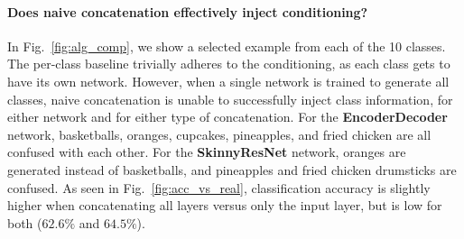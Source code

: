 \paragraph{Does naive concatenation effectively inject conditioning?} In Fig.~\ref{fig:alg_comp}, we show a selected example from each of the 10 classes. The per-class baseline trivially adheres to the conditioning, as each class gets to have its own network. However, when a single network is trained to generate all classes, naive concatenation is unable to successfully inject class information, for either network and for either type of concatenation. For the \textbf{EncoderDecoder} network, basketballs, oranges, cupcakes, pineapples, and fried chicken are all confused with each other. For the \textbf{SkinnyResNet} network, oranges are generated instead of basketballs, and pineapples and fried chicken drumsticks are confused. As seen in Fig.~\ref{fig:acc_vs_real}, classification accuracy is slightly higher when concatenating all layers versus only the input layer, but is low for both ($62.6\%$ and $64.5\%$).


